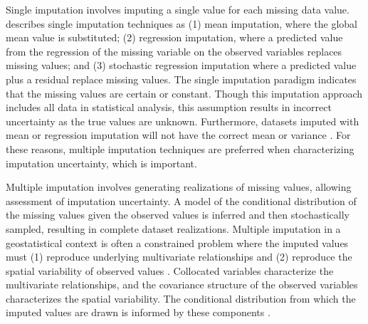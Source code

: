 Single imputation involves imputing a single value for each missing data value. \cite{little2019statistical} describes single imputation techniques as (1) mean imputation, where the global mean value is substituted; (2) regression imputation, where a predicted value from the regression of the missing variable on the observed variables replaces missing values; and (3) stochastic regression imputation where a predicted value plus a residual replace missing values. The single imputation paradigm indicates that the missing values are certain or constant. Though this imputation approach includes all data in statistical analysis, this assumption results in incorrect uncertainty as the true values are unknown. Furthermore, datasets imputed with mean or regression imputation will not have the correct mean or variance \citep{barnett2015multivariate}. For these reasons, multiple imputation techniques are preferred when characterizing imputation uncertainty, which is important.

Multiple imputation involves generating realizations of missing values, allowing assessment of imputation uncertainty. A model of the conditional distribution of the missing values given the observed values is inferred and then stochastically sampled, resulting in complete dataset realizations. Multiple imputation in a geostatistical context is often a constrained problem where the imputed values must (1) reproduce underlying multivariate relationships and (2) reproduce the spatial variability of observed values \citep{barnett2015multivariate}. Collocated variables characterize the multivariate relationships, and the covariance structure of the observed variables characterizes the spatial variability. The conditional distribution from which the imputed values are drawn is informed by these components \citep{hadavand2023spatial}.

